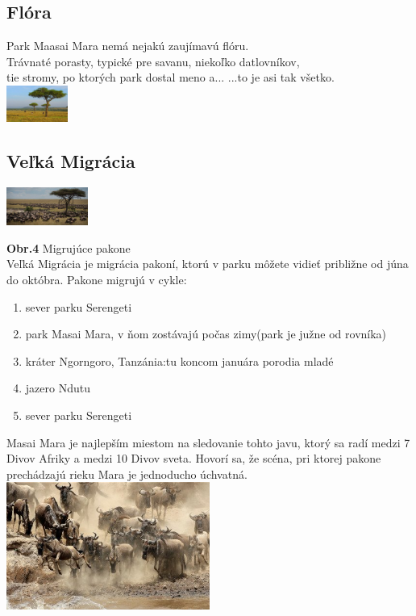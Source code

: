 \documentclass{article}
\begin{document}
\subsection{Flóra}
Park Maasai Mara nemá nejakú zaujímavú flóru.\\ Trávnaté porasty, typické pre savanu, niekoľko datlovníkov, \\tie stromy, po ktorých park dostal meno a... ...to je asi tak všetko.\\
\vskip 5cm
\includegraphics[width=0.15\textwidth,natwidth=200,natheight=200]{datlovnik.jpg}\\

\subsection{Veľká Migrácia}
\label{greatmigration}
\vskip 3cm
\includegraphics[width=0.2\textwidth,natwidth=200,natheight=200]{migracia-velka.jpg}

\textbf{Obr.4} Migrujúce pakone\\
Veľká Migrácia je migrácia pakoní, ktorú v parku môžete vidieť približne od júna do októbra.
Pakone migrujú v cykle:
\begin{enumerate}
\item sever parku Serengeti
\item park Masai Mara, v ňom zostávajú počas zimy(park je južne od rovníka)
\item kráter Ngorngoro, Tanzánia:tu koncom januára porodia mladé
\item jazero Ndutu
\item sever parku Serengeti
\end{enumerate}
Masai Mara je najlepším miestom na sledovanie tohto javu, ktorý sa radí medzi 7 Divov Afriky a medzi 10 Divov sveta.
Hovorí sa, že scéna, pri ktorej pakone prechádzajú rieku Mara je jednoducho úchvatná.
\vskip 2cm
\includegraphics[width=0.5\textwidth,natwidth=200,natheight=200]{pakone-mara.jpg}\\
\end{document}
